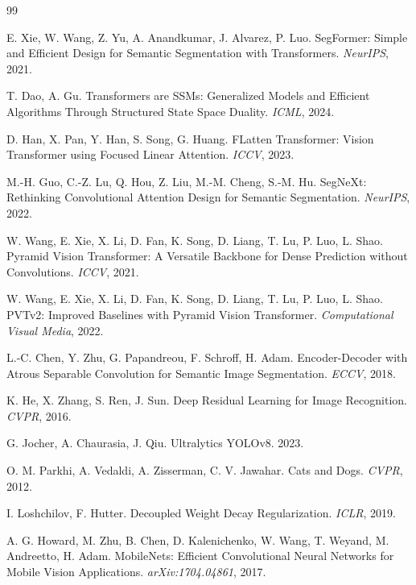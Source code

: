 \documentclass[3p,times,number]{elsarticle}
\begin{document}
\begin{thebibliography}{99}

E. Xie, W. Wang, Z. Yu, A. Anandkumar, J. Alvarez, P. Luo.
SegFormer: Simple and Efficient Design for Semantic Segmentation with Transformers.
\textit{NeurIPS}, 2021.

T. Dao, A. Gu.
Transformers are SSMs: Generalized Models and Efficient Algorithms Through Structured State
Space Duality.
\textit{ICML}, 2024.

D. Han, X. Pan, Y. Han, S. Song, G. Huang.
FLatten Transformer: Vision Transformer using Focused Linear Attention.
\textit{ICCV}, 2023.

M.-H. Guo, C.-Z. Lu, Q. Hou, Z. Liu, M.-M. Cheng, S.-M. Hu.
SegNeXt: Rethinking Convolutional Attention Design for Semantic Segmentation.
\textit{NeurIPS}, 2022.

W. Wang, E. Xie, X. Li, D. Fan, K. Song, D. Liang, T. Lu, P. Luo, L. Shao.
Pyramid Vision Transformer: A Versatile Backbone for Dense Prediction without Convolutions.
\textit{ICCV}, 2021.

W. Wang, E. Xie, X. Li, D. Fan, K. Song, D. Liang, T. Lu, P. Luo, L. Shao.
PVTv2: Improved Baselines with Pyramid Vision Transformer.
\textit{Computational Visual Media}, 2022.

L.-C. Chen, Y. Zhu, G. Papandreou, F. Schroff, H. Adam.
Encoder-Decoder with Atrous Separable Convolution for Semantic Image Segmentation.
\textit{ECCV}, 2018.

K. He, X. Zhang, S. Ren, J. Sun.
Deep Residual Learning for Image Recognition.
\textit{CVPR}, 2016.

G. Jocher, A. Chaurasia, J. Qiu.
Ultralytics YOLOv8. 2023.

O. M. Parkhi, A. Vedaldi, A. Zisserman, C. V. Jawahar.
Cats and Dogs.
\textit{CVPR}, 2012.

I. Loshchilov, F. Hutter.
Decoupled Weight Decay Regularization.
\textit{ICLR}, 2019.

A. G. Howard, M. Zhu, B. Chen, D. Kalenichenko, W. Wang, T. Weyand, M. Andreetto, H. Adam.
MobileNets: Efficient Convolutional Neural Networks for Mobile Vision Applications.
\textit{arXiv:1704.04861}, 2017.

\end{thebibliography}
\end{document}
